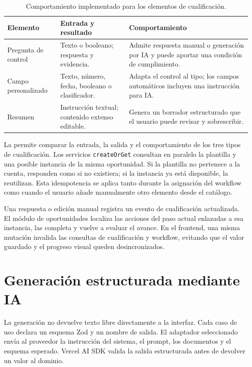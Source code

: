 \begin{table}[htbp]
  \centering
  \caption{Comportamiento implementado para los elementos de cualificación.}
  \label{tab:qualification-implementation}
  \begin{tabular}{L{0.22\textwidth} L{0.31\textwidth} L{0.38\textwidth}}
    \toprule
    \textbf{Elemento} & \textbf{Entrada y resultado} & \textbf{Comportamiento} \\
    \midrule
    Pregunta de control & Texto o booleano; respuesta y evidencia. & Admite respuesta manual o generación por IA y puede aportar una condición de cumplimiento. \\
    Campo personalizado & Texto, número, fecha, booleano o clasificador. & Adapta el control al tipo; los campos automáticos incluyen una instrucción para IA. \\
    Resumen & Instrucción textual; contenido extenso editable. & Genera un borrador estructurado que el usuario puede revisar y sobrescribir. \\
    \bottomrule
  \end{tabular}
\end{table}

La  permite comparar la entrada, la
salida y el comportamiento de los tres tipos de cualificación. Los servicios
\texttt{createOrGet} consultan en paralelo la plantilla y una
posible instancia de la misma oportunidad. Si la plantilla no pertenece a la
cuenta, responden como si no existiera; si la instancia ya está disponible, la
reutilizan. Esta idempotencia se aplica tanto durante la asignación del
workflow como cuando el usuario añade manualmente otro elemento desde el
catálogo.

Una respuesta o edición manual registra un evento de cualificación actualizada.
El módulo de oportunidades localiza las acciones del paso actual enlazadas a
esa instancia, las completa y vuelve a evaluar el avance. En el frontend, una
misma mutación invalida las consultas de cualificación y workflow, evitando
que el valor guardado y el progreso visual queden desincronizados.

\section{Generación estructurada mediante IA}

La generación no devuelve texto libre directamente a la interfaz. Cada caso de
uso declara un esquema Zod y un nombre de salida. El adaptador seleccionado
envía al proveedor la instrucción del sistema, el prompt, los documentos y el
esquema esperado. Vercel AI SDK valida la salida estructurada antes de devolver
un valor al dominio.

